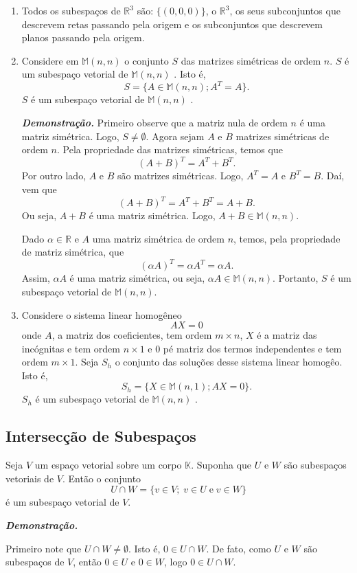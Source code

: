 \begin{enumerate}
\item Todos os subespaços de $\mathbb{R}^3$ são:  $\{(0,0,0)\}$, o  $\mathbb{R}^3$, os seus subconjuntos que descrevem  retas passando pela origem e os subconjuntos que descrevem planos passando pela origem.


\item Considere em $\mathbb{M}(n,n)$  o conjunto $S$ das matrizes simétricas de ordem $n$.  $S$ é um subespaço vetorial de $\mathbb{M}(n,n)$ . Isto é, $$S=\{ A \in \mathbb{M}(n,n); A^T=A\}.$$ $S$ é um subespaço vetorial de $\mathbb{M}(n,n)$ .

\textbf{\textit{Demonstração.}}
Primeiro observe que a matriz nula de ordem $n$ é uma matriz simétrica. Logo, $ S \neq \emptyset$.  Agora sejam $A$ e $B$ matrizes simétricas de ordem $n$. Pela propriedade das matrizes  simétricas, temos que $$ (A+B)^T=A^T+B^T. $$
Por outro lado, $A$ e $B$ são matrizes simétricas. Logo, $A^T=A$ e $B^T=B$. Daí, vem que  $$ (A+B)^T=A^T+B^T = A +B .$$ Ou seja, $A+B$ é uma matriz simétrica. Logo, $A+B \in  \mathbb{M}(n,n)$.

Dado $\alpha \in \mathbb{R}$ e $A$ uma matriz simétrica de ordem $n$, temos, pela propriedade de matriz simétrica, que  $$(\alpha A)^T= \alpha A^T=\alpha A.$$ Assim, $\alpha A$ é uma matriz simétrica, ou seja, $\alpha A \in \mathbb{M}(n,n)$. Portanto, $S$ é um subespaço vetorial de $\mathbb{M}(n,n)$.


\item Considere o sistema linear homogêneo $$AX=0$$ onde  $A$, a matriz dos coeficientes, tem  ordem $m \times n$, $X$ é a matriz das incógnitas  e tem ordem $n \times 1$ e $0$ pé matriz dos termos independentes e tem ordem $ m \times 1$.  Seja $S_h$ o conjunto das soluções desse sistema linear homogêo.  Isto é,
$$S_h=\{ X \in \mathbb{M}(n,1); AX=0 \}.$$  $S_h$ é um subespaço vetorial de $\mathbb{M}(n,n)$ .
\end{enumerate}

\subsection{Intersecção de Subespaços}
Seja  $V$ um espaço vetorial sobre um corpo $\mathbb{K}$. Suponha que $U$ e $W$ são  subespaços vetoriais de $V$. Então o conjunto
$$U\cap W=\{ v \in V;  \; v \in U \; \text{e} \; v \in W \} $$ é um subespaço vetorial de $V$.

\textbf{\textit{Demonstração.}}

Primeiro note que $U\cap W \neq \emptyset$. Isto é, $0 \in U\cap W$. De fato,  como $U$ e $W$ são subespaços de $V$, então $0 \in U$ e $0 \in W$, logo $0 \in U\cap W$.

